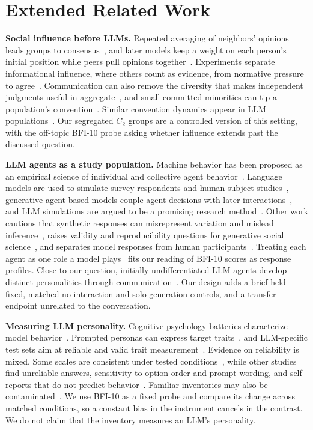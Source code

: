 \section{Extended Related Work}\label{app:related}
\textbf{Social influence before LLMs.} Repeated averaging of neighbors' opinions leads groups to consensus~\citep{DeGroot1974}, and later models keep a weight on each person's initial position while peers pull opinions together~\citep{Friedkin1990}. Experiments separate informational influence, where others count as evidence, from normative pressure to agree~\citep{Deutsch1955,Asch1956_Conformity}. Communication can also remove the diversity that makes independent judgments useful in aggregate~\citep{Lorenz2011}, and small committed minorities can tip a population's convention~\citep{Centola2018}. Similar convention dynamics appear in LLM populations~\citep{FlintAshery2025_Conventions}. Our segregated $C_2$ groups are a controlled version of this setting, with the off-topic BFI-10 probe asking whether influence extends past the discussed question.

\textbf{LLM agents as a study population.} Machine behavior has been proposed as an empirical science of individual and collective agent behavior~\citep{Rahwan2019}. Language models are used to simulate survey respondents and human-subject studies~\citep{Argyle2023,Aher2023_SimulateHumans}, generative agent-based models couple agent decisions with later interactions~\citep{Ghaffarzadegan2024}, and LLM simulations are argued to be a promising research method~\citep{Anthis2025_SocialSim}. Other work cautions that synthetic responses can misrepresent variation and mislead inference~\citep{Bisbee2024}, raises validity and reproducibility questions for generative social science~\citep{Bail2024}, and separates model responses from human participants~\citep{Dillion2023}. Treating each agent as one role a model plays~\citep{Shanahan2023} fits our reading of BFI-10 scores as response profiles. Close to our question, initially undifferentiated LLM agents develop distinct personalities through communication~\citep{Takata2024}. Our design adds a brief held fixed, matched no-interaction and solo-generation controls, and a transfer endpoint unrelated to the conversation.

\textbf{Measuring LLM personality.} Cognitive-psychology batteries characterize model behavior~\citep{Binz2023,CogBench}. Prompted personas can express target traits~\citep{Jiang2024_PersonaLLM}, and LLM-specific test sets aim at reliable and valid trait measurement~\citep{Lee2025_TRAIT}. Evidence on reliability is mixed. Some scales are consistent under tested conditions~\citep{Huang2024_ScaleReliability}, while other studies find unreliable answers, sensitivity to option order and prompt wording, and self-reports that do not predict behavior~\citep{Shu2024_PsychReliability,Gupta2024_SelfAssessment,Han2025_PersonalityIllusion,Sclar2024_PromptFormat}. Familiar inventories may also be contaminated~\citep{Han2026_Contamination}. We use BFI-10 as a fixed probe and compare its change across matched conditions, so a constant bias in the instrument cancels in the contrast. We do not claim that the inventory measures an LLM's personality.

